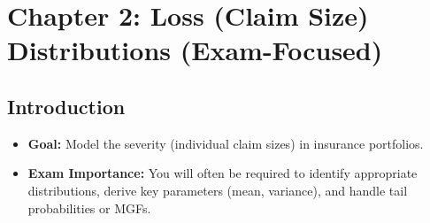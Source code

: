 \documentclass[13pt,a4paper]{article}
\begin{document}
\section{Chapter 2: Loss (Claim Size) Distributions (Exam-Focused)}
\label{sec:chapter2}

\subsection{Introduction}
\begin{itemize}
  \item \textbf{Goal:} Model the severity (individual claim sizes) in insurance portfolios.
  \item \textbf{Exam Importance:} You will often be required to identify appropriate distributions, derive key parameters (mean, variance), and handle tail probabilities or MGFs.
\end{itemize}
\end{document}

